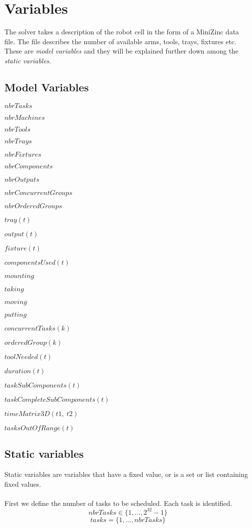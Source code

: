  \section{Variables}
 The solver takes a description of the robot cell in the form of a MiniZinc data file. The file describes the number of available arms, tools, trays, fixtures etc. These are \emph{model variables} and they will be explained further down among the \emph{static variables}.
 
 \subsection{Model Variables}
\begin{itemize*}
\item $nbrTasks$
\item $nbrMachines$
\item $nbrTools$
\item $nbrTrays$
\item $nbrFixtures$
\item $nbrComponents$
\item $nbrOutputs$
\item $nbrConcurrentGroups$
\item $nbrOrderedGroups$
\item $tray(t)$
\item $output(t)$
\item $fixture(t)$
\item $componentsUsed(t)$
\item $mounting$
\item $taking$
\item $moving$
\item $putting$
\item $concurrentTasks(k)$
\item $orderedGroup(k)$
\item $toolNeeded(t)$
\item $duration(t)$
\item $taskSubComponents(t)$
\item $taskCompleteSubComponents(t)$
\item $timeMatrix3D(t1, \; t2)$
\item $tasksOutOfRange(t)$
\end{itemize*}
 
 \newpage
 
 \subsection{Static variables}
 Static variables are variables that have a fixed value, or is a set or list containing fixed values.
 \\\\
  First we define the number of tasks to be scheduled. Each task is identified.
 \begin{equation}\label{eq:1}
 nbrTasks \in \{1 , \ldots , 2^{32}-1\}
 \end{equation}
 \begin{equation}\label{eq:10}
 tasks = \{1 , \ldots , nbrTasks\}
 \end{equation}

